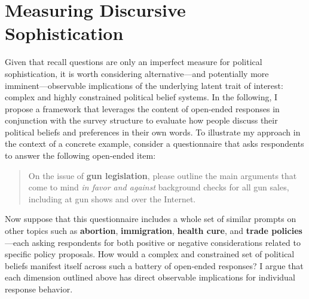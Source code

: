 

\section*{Measuring Discursive Sophistication}


Given that recall questions are only an imperfect measure for political sophistication, it is worth considering alternative---and potentially more imminent---observable implications of the underlying latent trait of interest: complex and highly constrained political belief systems. In the following, I propose a framework that leverages the content of open-ended responses in conjunction with the survey structure to evaluate how people discuss their political beliefs and preferences in their own words. To illustrate my approach in the context of a concrete example, consider a questionnaire that asks respondents to answer the following open-ended item:

\begin{quote}
	On the issue of \textbf{gun legislation}, please outline the main arguments that come to mind \textit{in favor and against} background checks for all gun sales, including at gun shows and over the Internet.
\end{quote}

Now suppose that this questionnaire includes a whole set of similar prompts on other topics such as \textbf{abortion}, \textbf{immigration}, \textbf{health cure}, and \textbf{trade policies}---each asking respondents for both positive or negative considerations related to specific policy proposals. How would a complex and constrained set of political beliefs manifest itself across such a battery of open-ended responses? I argue that each dimension outlined above has direct observable implications for individual response behavior.

